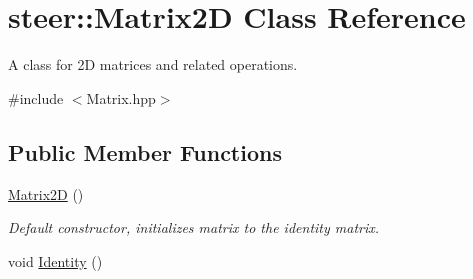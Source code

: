 \hypertarget{classsteer_1_1_matrix2_d}{\section{steer\-:\-:Matrix2\-D Class Reference}
\label{classsteer_1_1_matrix2_d}
}


A class for 2\-D matrices and related operations.  




{\ttfamily \#include $<$Matrix.\-hpp$>$}

\subsection*{Public Member Functions}
\begin{DoxyCompactItemize}
\item 
\hypertarget{classsteer_1_1_matrix2_d_a8a245f41ad5e61b3940cb61a83dff30b}{\hyperlink{classsteer_1_1_matrix2_d_a8a245f41ad5e61b3940cb61a83dff30b}{Matrix2\-D} ()}\label{classsteer_1_1_matrix2_d_a8a245f41ad5e61b3940cb61a83dff30b}

\begin{DoxyCompactList}\small\item\em Default constructor, initializes matrix to the identity matrix. \end{DoxyCompactList}\item 
\hypertarget{classsteer_1_1_matrix2_d_a924fe5e55add3d19b11610c38e1eedaa}{void \hyperlink{classsteer_1_1_matrix2_d_a924fe5e55add3d19b11610c38e1eedaa}{Identity} ()}\label{classsteer_1_1_matrix2_d_a924fe5e55add3d19b11610c38e1eedaa}


\end{DoxyCompactItemize}
